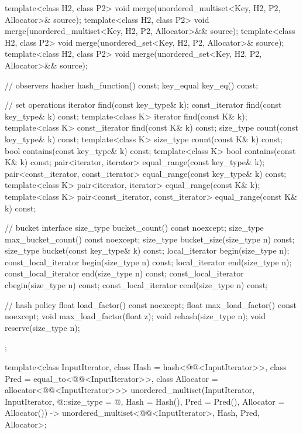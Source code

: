 \begin{codeblock}
{{    template<class H2, class P2>
      void merge(unordered_multiset<Key, H2, P2, Allocator>& source);
    template<class H2, class P2>
      void merge(unordered_multiset<Key, H2, P2, Allocator>&& source);
    template<class H2, class P2>
      void merge(unordered_set<Key, H2, P2, Allocator>& source);
    template<class H2, class P2>
      void merge(unordered_set<Key, H2, P2, Allocator>&& source);

    // observers
    hasher hash_function() const;
    key_equal key_eq() const;

    // set operations
    iterator         find(const key_type& k);
    const_iterator   find(const key_type& k) const;
    template<class K>
      iterator       find(const K& k);
    template<class K>
      const_iterator find(const K& k) const;
    size_type        count(const key_type& k) const;
    template<class K>
      size_type      count(const K& k) const;
    bool             contains(const key_type& k) const;
    template<class K>
      bool           contains(const K& k) const;
    pair<iterator, iterator>               equal_range(const key_type& k);
    pair<const_iterator, const_iterator>   equal_range(const key_type& k) const;
    template<class K>
      pair<iterator, iterator>             equal_range(const K& k);
    template<class K>
      pair<const_iterator, const_iterator> equal_range(const K& k) const;

    // bucket interface
    size_type bucket_count() const noexcept;
    size_type max_bucket_count() const noexcept;
    size_type bucket_size(size_type n) const;
    size_type bucket(const key_type& k) const;
    local_iterator begin(size_type n);
    const_local_iterator begin(size_type n) const;
    local_iterator end(size_type n);
    const_local_iterator end(size_type n) const;
    const_local_iterator cbegin(size_type n) const;
    const_local_iterator cend(size_type n) const;

    // hash policy
    float load_factor() const noexcept;
    float max_load_factor() const noexcept;
    void max_load_factor(float z);
    void rehash(size_type n);
    void reserve(size_type n);
  };

  template<class InputIterator,
           class Hash = hash<@@<InputIterator>>,
           class Pred = equal_to<@@<InputIterator>>,
           class Allocator = allocator<@@<InputIterator>>>
    unordered_multiset(InputIterator, InputIterator, @\seebelow@::size_type = @\seebelow@,
                       Hash = Hash(), Pred = Pred(), Allocator = Allocator())
      -> unordered_multiset<@@<InputIterator>,
                            Hash, Pred, Allocator>;

}
\end{codeblock}
